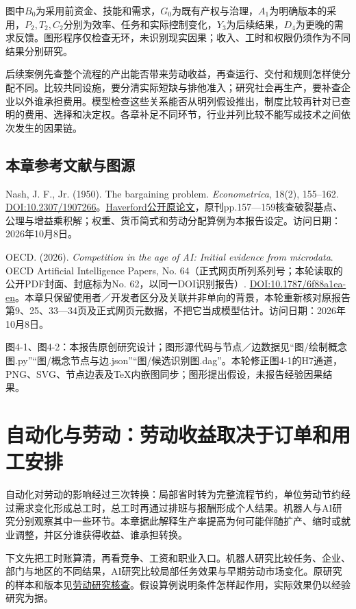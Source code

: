 \documentclass[UTF8,fontset=windows,12pt,a4paper,oneside,openany]{ctexbook}
\begin{document}
图中$B_0$为采用前资金、技能和需求，$G_0$为既有产权与治理，$A_1$为明确版本的采用，$P_2,T_2,C_2$分别为效率、任务和实际控制变化，$Y_3$为后续结果，$D_4$为更晚的需求反馈。图形程序仅检查无环，未识别现实因果；收入、工时和权限仍须作为不同结果分别研究。

后续案例先查整个流程的产出能否带来劳动收益，再查运行、交付和规则怎样使分配不同。比较共同设施，要分清实际短缺与排他准入；研究社会再生产，要补查企业以外谁承担费用。模型检查这些关系能否从明列假设推出，制度比较再针对已查明的费用、选择和决定权。各章补足不同环节，行业并列比较不能写成技术之间依次发生的因果链。

\section{本章参考文献与图源}

Nash, J. F., Jr. (1950). The bargaining problem. \emph{Econometrica}, 18(2), 155–162. \href{https://doi.org/10.2307/1907266}{DOI:10.2307/1907266}。\href{https://www.haverford.edu/sites/default/files/Nash1950.pdf}{Haverford公开原论文}，原刊pp.157—159核查破裂基点、公理与增益乘积解；权重、货币简式和劳动分配算例为本报告设定。访问日期：2026年10月8日。

OECD. (2026). \emph{Competition in the age of AI: Initial evidence from microdata}. OECD Artificial Intelligence Papers, No. 64（正式网页所列系列号；本轮读取的公开PDF封面、封底标为No. 62，以同一DOI识别报告）. \href{https://doi.org/10.1787/6f88a1ea-en}{DOI:10.1787/6f88a1ea-en}。本章只保留使用者／开发者区分及关联并非单向的背景，本轮重新核对原报告第9、25、33—34页及正式网页元数据，不把它当成模型估计。访问日期：2026年10月8日。

图4-1、图4-2：本报告原创研究设计；图形源代码与节点／边数据见“图/绘制概念图.py”“图/概念节点与边.json”“图/候选识别图.dag”。本轮修正图4-1的H7通道，PNG、SVG、节点边表及TeX内嵌图同步；图形提出假设，未报告经验因果结果。

\chapter{自动化与劳动：劳动收益取决于订单和用工安排}\label{ch:5}

自动化对劳动的影响经过三次转换：局部省时转为完整流程节约，单位劳动节约经过需求变化形成总工时，总工时再通过排班与报酬形成个人结果。机器人与AI研究分别观察其中一些环节。本章据此解释生产率提高为何可能伴随扩产、缩时或就业调整，并区分谁获得收益、谁承担转换。

下文先把工时账算清，再看竞争、工资和职业入口。机器人研究比较任务、企业、部门与地区的不同结果，AI研究比较局部任务效果与早期劳动市场变化。原研究的样本和版本见\hyperref[ch:5]{劳动研究核查}。假设算例说明条件怎样起作用，实际效果仍以经验研究为据。
\end{document}
